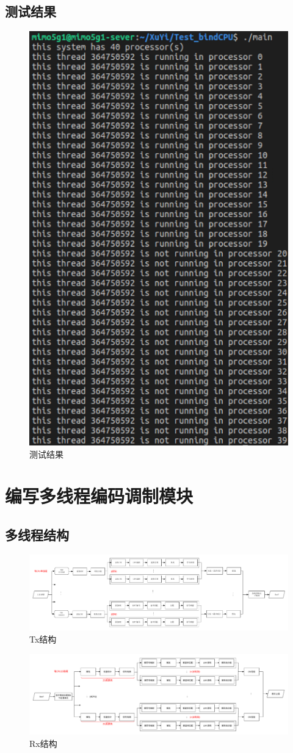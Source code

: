 \documentclass{article}
\begin{document}
\subsection{测试结果}
\begin{figure}[H]
	\centering
	\includegraphics[width = .6\textwidth]{testCPU.png}
	\caption{测试结果}
\end{figure}

\section{编写多线程编码调制模块}
\subsection{多线程结构}
\begin{figure}[H]
	\centering
	\includegraphics[width = \textwidth]{txstru.pdf}
	\caption{Tx结构}
\end{figure}
\begin{figure}[H]
	\centering
	\includegraphics[width = \textwidth]{rxstru.pdf}
	\caption{Rx结构}
\end{figure}
\end{document}
